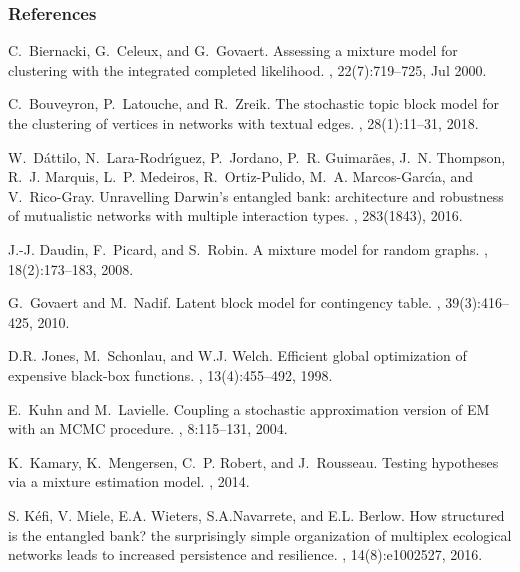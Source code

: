 \documentclass[nopagenumber,9pt]{beamer}
\begin{document}
 \frametitle{References}
\begin{thebibliography}{NS01}

C.~Biernacki, G.~Celeux, and G.~Govaert.
\newblock Assessing a mixture model for clustering with the integrated
  completed likelihood.
, 22(7):719--725, Jul 2000.

C.~Bouveyron, P.~Latouche, and R.~Zreik.
\newblock The stochastic topic block model for the clustering of vertices in
  networks with textual edges.
, 28(1):11--31, 2018.

W.~D{\'a}ttilo, N.~Lara-Rodr{\'\i}guez, P.~Jordano, P.~R. Guimar{\~a}es, J.~N.
  Thompson, R.~J. Marquis, L.~P. Medeiros, R.~Ortiz-Pulido, M.~A.
  Marcos-Garc{\'\i}a, and V.~Rico-Gray.
\newblock Unravelling {D}arwin{\textquoteright}s entangled bank: architecture
  and robustness of mutualistic networks with multiple interaction types.
, 283(1843), 2016.

J.-J. Daudin, F.~Picard, and S.~Robin.
\newblock A mixture model for random graphs.
, 18(2):173--183, 2008.

G.~Govaert and M.~Nadif.
\newblock Latent block model for contingency table.
,
  39(3):416--425, 2010.

D.R. Jones, M.~Schonlau, and W.J. Welch.
\newblock Efficient global optimization of expensive black-box functions.
, 13(4):455--492, 1998.

E.~Kuhn and M.~Lavielle.
\newblock Coupling a stochastic approximation version of {EM} with an {MCMC}
  procedure.
, 8:115--131, 2004.

K.~Kamary, K.~Mengersen, C.~P. Robert, and J.~Rousseau.
\newblock Testing hypotheses via a mixture estimation model.
, 2014.

S. K{\'e}fi, V. Miele, E.A. Wieters, S.A.Navarrete, and E.L.
  Berlow.
\newblock How structured is the entangled bank? the surprisingly simple
  organization of multiplex ecological networks leads to increased persistence
  and resilience.
, 14(8):e1002527, 2016.



\end{thebibliography}
\end{document}
